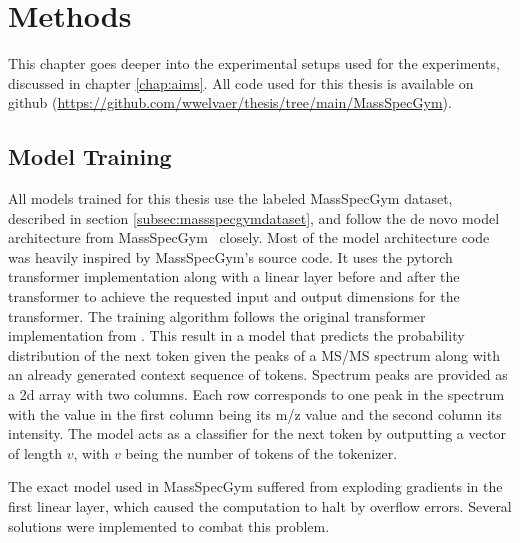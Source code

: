 \chapter{Methods}
\label{chap:methods}

This chapter goes deeper into the experimental setups used for the experiments, discussed in chapter \ref{chap:aims}.
All code used for this thesis is available on github (\url{https://github.com/wwelvaer/thesis/tree/main/MassSpecGym}).

\section{Model Training}
\label{sec:training}

All models trained for this thesis use the labeled MassSpecGym dataset, described in section \ref{subsec:massspecgymdataset}, and follow the de novo model architecture from MassSpecGym~\cite{bushuiev2024massspecgym} closely.
Most of the model architecture code was heavily inspired by MassSpecGym's source code.
It uses the pytorch transformer implementation along with a linear layer before and after the transformer to achieve the requested input and output dimensions for the transformer.
The training algorithm follows the original transformer implementation from \textcite{vaswani2017attention}.
This result in a model that predicts the probability distribution of the next token given the peaks of a \ac{MS/MS} spectrum along with an already generated context sequence of tokens.
Spectrum peaks are provided as a 2d array with two columns. Each row corresponds to one peak in the spectrum with the value in the first column being its m/z value and the second column its intensity.
The model acts as a classifier for the next token by outputting a vector of length $v$, with $v$ being the number of tokens of the tokenizer.

The exact model used in MassSpecGym suffered from exploding gradients in the first linear layer, which caused the computation to halt by overflow errors.
Several solutions were implemented to combat this problem.

